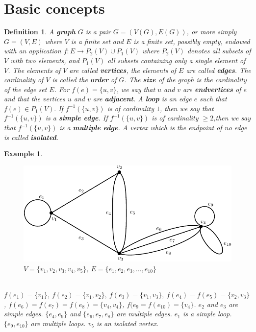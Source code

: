 \documentclass[12pt,a4paper]{article}
\newtheorem{defn}{Definition}[section]
\newtheorem{exmp}{Example}[section]
\theoremstyle{definition}
\begin{document}
\section{Basic concepts}
\begin{defn} A \textbf{graph} $G$ is a pair $G=(V(G),E(G))$, or more simply $G=(V,E)$ where $V$ is a finite set and $E$ is a finite set, possibly empty, endowed with an application $f: E \to P_2(V) \cup P_1(V)$ where $P_2(V)$ denotes all subsets of $V$ with two elements, and $P_1(V)$ all subsets containing only a single element of $V$. The elements of $V$ are called \textbf{vertices}, the elements of $E$ are called \textbf{edges}. The cardinality of $V$ is called the \textbf{order} of $G$. The \textbf{size} of the graph is the cardinality of the edge set $E$. For $f(e)= \{u,v\}$, we say that $u$ and $v$ are \textbf{endvertices} of $e$ and that the vertices $u$ and $v$ are \textbf{adjacent}. A \textbf{loop} is an edge $e$ such that $f(e) \in P_1(V).$ If $f^{-1}(\{u,v\})$ is of cardinality $1$, then we say that $f^{-1}(\{u,v\})$ is a \textbf{simple edge}. If $f^{-1}(\{u,v\})$ is of cardinality $\geq 2$,then we say that $f^{-1}(\{u,v\})$ is a \textbf{multiple edge}. A vertex which is the endpoint of no edge is called \textbf{isolated}. 
\end{defn}
\newpage
\begin{exmp} \
\begin{figure}[hbtp]
\centering
\includegraphics[scale=1]{images/graph1.pdf}
\caption{$V=\{v_1,v_2,v_3,v_4,v_5\}$, $E=\{e_1,e_2,e_3,\dots,e_{10}\}$}
\end{figure} \\
$f(e_1)=\{v_1\}, \ f(e_2)= \{v_1,v_2\}, \ f(e_3)= \{v_1,v_3\}, \ f(e_4)= f(e_5)= \{v_2,v_3\}$, $f(e_6)=f(e_7)=f(e_8)=\{v_4,v_4\}$, $f(e_9=f(e_{10}) = \{v_4\}$. $e_2$ and $e_3$ are simple edges. $\{e_4,e_9\}$ and $\{e_6,e_7,e_8\}$ are multiple edges. $e_1$ is a simple loop. $\{e_9, e_{10}\}$ are multiple loops. $v_5$ is an isolated vertex. 
\end{exmp}
\end{document}
